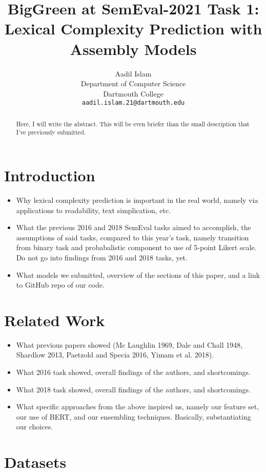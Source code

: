 \documentclass[11pt,a4paper]{article}
\title{BigGreen at SemEval-2021 Task 1: \\
Lexical Complexity Prediction with Assembly Models}
\author{
  Aadil Islam\\
  Department of Computer Science\\
  Dartmouth College\\
  \texttt{aadil.islam.21@dartmouth.edu}
}
\date{}
\begin{document}
\maketitle
\begin{abstract}
  Here, I will write the abstract. This will be even briefer than the small description that I've previously submitted.
\end{abstract}

\section{Introduction}

\begin{itemize}
  \item Why lexical complexity prediction is important in the real world, namely via applications to readability, text simplication, etc.
  \item What the previous 2016 and 2018 SemEval tasks aimed to accomplish, the assumptions of said tasks, compared to this year's task, namely transition from binary task and probabalistic component to use of 5-point Likert scale. Do not go into findings from 2016 and 2018 tasks, yet.
  \item What models we submitted, overview of the sections of this paper, and a link to GitHub repo of our code.
\end{itemize}

\section{Related Work}

\begin{itemize}
  \item What previous papers showed (Mc Laughlin 1969, Dale and Chall 1948, Shardlow 2013, Paetzold and Specia 2016, Yimam et al. 2018).
  \item What 2016 task showed, overall findings of the authors, and shortcomings. 
  \item What 2018 task showed, overall findings of the authors, and shortcomings.
  \item What specific approaches from the above inspired us, namely our feature set, our use of BERT, and our ensembling techniques. Basically, substantiating our choices.
\end{itemize}

\section{Datasets}
\end{document}
